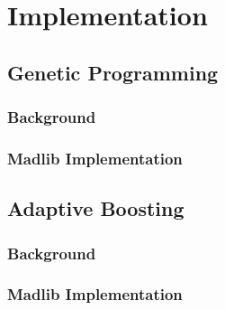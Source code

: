 
\section{Implementation}
\subsection{Genetic Programming}
\subsubsection{Background}
\subsubsection{Madlib Implementation}
\subsection{Adaptive Boosting}
\subsubsection{Background}
\subsubsection{Madlib Implementation}
